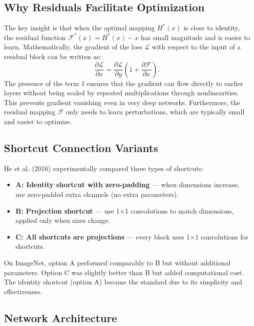 \documentclass[11pt,a4paper]{article}
\begin{document}
\subsection{Why Residuals Facilitate Optimization}
The key insight is that when the optimal mapping $H^*(x)$ is close to identity, the residual function $\mathcal{F}^*(x) = H^*(x) - x$ has small magnitude and is easier to learn. Mathematically, the gradient of the loss $\mathcal{L}$ with respect to the input of a residual block can be written as:
\begin{equation}
    \frac{\partial \mathcal{L}}{\partial x} = \frac{\partial \mathcal{L}}{\partial y} \left(1 + \frac{\partial \mathcal{F}}{\partial x}\right).
    \label{eq:gradient}
\end{equation}
The presence of the term $1$ ensures that the gradient can flow directly to earlier layers without being scaled by repeated multiplications through nonlinearities. This prevents gradient vanishing even in very deep networks. Furthermore, the residual mapping $\mathcal{F}$ only needs to learn perturbations, which are typically small and easier to optimize.

\subsection{Shortcut Connection Variants}
He et al. (2016) experimentally compared three types of shortcuts:
\begin{itemize}
    \item \textbf{A: Identity shortcut with zero-padding} — when dimensions increase, use zero-padded extra channels (no extra parameters).
    \item \textbf{B: Projection shortcut} — use 1×1 convolutions to match dimensions, applied only when sizes change.
    \item \textbf{C: All shortcuts are projections} — every block uses 1×1 convolutions for shortcuts.
\end{itemize}
On ImageNet, option A performed comparably to B but without additional parameters. Option C was slightly better than B but added computational cost. The identity shortcut (option A) became the standard due to its simplicity and effectiveness.

\subsection{Network Architecture}
\label{subsec:architecture}
\end{document}

